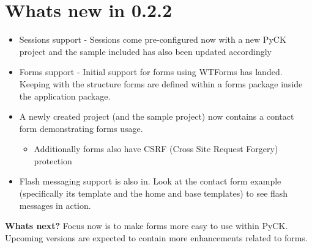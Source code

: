 \documentclass[letterpaper,10pt,english]{sphinxmanual}
\begin{document}
\section{Whats new in 0.2.2}
\label{changes:whats-new-in-0-2-2}\begin{itemize}
\item {} 
Sessions support - Sessions come pre-configured now with a new PyCK project and the sample included has also been updated accordingly

\item {} 
Forms support - Initial support for forms using WTForms has landed. Keeping with the structure forms are defined within a forms package inside the application package.

\item {} 
A newly created project (and the sample project) now contains a contact form demonstrating forms usage.
\begin{itemize}
\item {} 
Additionally forms also have CSRF (Cross Site Request Forgery) protection

\end{itemize}

\item {} 
Flash messaging support is also in. Look at the contact form example (specifically its template and the home and base templates) to see flash messages in action.

\end{itemize}

\textbf{Whats next?} Focus now is to make forms more easy to use within PyCK. Upcoming versions are expected to contain more enhancements related to forms.
\end{document}
